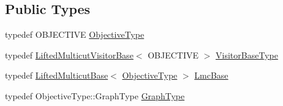 \subsection*{Public Types}
\begin{DoxyCompactItemize}
\item 
typedef O\+B\+J\+E\+C\+T\+I\+VE \hyperlink{classnifty_1_1graph_1_1opt_1_1lifted__multicut_1_1PyLiftedMulticutVisitorBase_a9e8855d94040cf1e16d59cad6a8dabd5}{Objective\+Type}
\item 
typedef \hyperlink{namespacenifty_1_1graph_1_1opt_1_1lifted__multicut_a3350124f8869505fecf39d697b9b2718}{Lifted\+Multicut\+Visitor\+Base}$<$ O\+B\+J\+E\+C\+T\+I\+VE $>$ \hyperlink{classnifty_1_1graph_1_1opt_1_1lifted__multicut_1_1PyLiftedMulticutVisitorBase_a559b64ba9b334622ef91ec4e2e927be4}{Visitor\+Base\+Type}
\item 
typedef \hyperlink{classnifty_1_1graph_1_1opt_1_1lifted__multicut_1_1LiftedMulticutBase}{Lifted\+Multicut\+Base}$<$ \hyperlink{classnifty_1_1graph_1_1opt_1_1lifted__multicut_1_1PyLiftedMulticutVisitorBase_a9e8855d94040cf1e16d59cad6a8dabd5}{Objective\+Type} $>$ \hyperlink{classnifty_1_1graph_1_1opt_1_1lifted__multicut_1_1PyLiftedMulticutVisitorBase_ab42d6b0fdecfe2dc9232654ce690c923}{Lmc\+Base}
\item 
typedef Objective\+Type\+::\+Graph\+Type \hyperlink{classnifty_1_1graph_1_1opt_1_1lifted__multicut_1_1PyLiftedMulticutVisitorBase_a9d2428fd2f0972bd1214adb32262f694}{Graph\+Type}
\end{DoxyCompactItemize}
